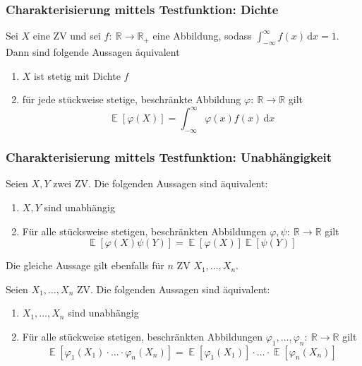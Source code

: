 \documentclass[a4paper,10pt]{article}
\def\R{\mathbb{R}}
\DeclareMathOperator{\E}{\mathbb{E}}
\numberwithin{equation}{section}
\begin{document}
\subsubsection{Charakterisierung mittels Testfunktion: Dichte}

\begin{mainbox}{}
    Sei \( X \) eine ZV und sei \( f: \: \R \to \R_+ \) eine Abbildung, sodass \( \int_{-\infty}^{\infty} f(x) \, \mathrm{d}x = 1 \). Dann sind folgende Aussagen äquivalent
    \begin{enumerate}
        \item \( X \) ist stetig mit Dichte \( f \)
        \item für jede stückweise stetige, beschränkte Abbildung \( \varphi: \: \R \to \R \) gilt
        \[
            \E[\varphi(X)] = \int_{-\infty}^\infty \varphi(x) f(x) \, \mathrm{d}x
        \]
    \end{enumerate}
\end{mainbox}

\subsubsection{Charakterisierung mittels Testfunktion: Unabhängigkeit}

\begin{mainbox}{}
    Seien \( X, Y \) zwei ZV. Die folgenden Aussagen sind äquivalent:
    \begin{enumerate}
        \item \( X, Y \) sind unabhängig
        \item Für alle stücksweise stetigen, beschränkten Abbildungen \( \varphi, \psi: \: \R \to \R \) gilt
        \[
            \E[\varphi(X) \psi(Y)] = \E[\varphi(X)] \E[\psi(Y)]
        \]
    \end{enumerate}
\end{mainbox}

Die gleiche Aussage gilt ebenfalls für \( n \) ZV \( X_1, \dots, X_n \).
\begin{mainbox}{}
    Seien \( X_1, \dots, X_n \) ZV. Die folgenden Aussagen sind äquivalent:
    \begin{enumerate}
        \item \( X_1, \dots, X_n \) sind unabhängig
        \item Für alle stückweise stetigen, beschränkten Abbildungen \( \varphi_1, \dots, \varphi_n: \: \R \to \R \) gilt
        \[
            \E[\varphi_1(X_1) \cdot \dots \cdot \varphi_n(X_n)] = \E[\varphi_1(X_1)] \cdot \dots \cdot \E[\varphi_n(X_n)]
        \]
    \end{enumerate}
\end{mainbox}
\end{document}
